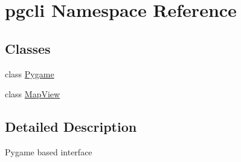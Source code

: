 \hypertarget{namespacepgcli}{\section{pgcli \-Namespace \-Reference}
\label{namespacepgcli}
}
\subsection*{\-Classes}
\begin{DoxyCompactItemize}
\item 
class \hyperlink{classpgcli_1_1_pygame}{\-Pygame}
\item 
class \hyperlink{classpgcli_1_1_map_view}{\-Map\-View}
\end{DoxyCompactItemize}


\subsection{\-Detailed \-Description}
\begin{DoxyVerb}
    Pygame based interface 
\end{DoxyVerb}
 